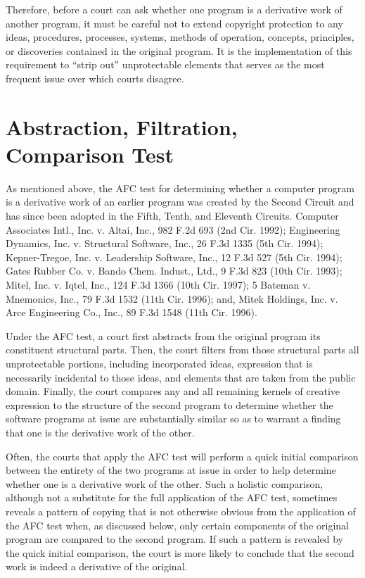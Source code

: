Therefore, before a court can ask whether one program is a derivative work
of another program, it must be careful not to extend copyright protection
to any ideas, procedures, processes, systems, methods of operation,
concepts, principles, or discoveries contained in the original program. It
is the implementation of this requirement to ``strip out'' unprotectable
elements that serves as the most frequent issue over which courts
disagree.

\section{Abstraction, Filtration, Comparison Test}

As mentioned above, the AFC test for determining whether a computer
program is a derivative work of an earlier program was created by the
Second Circuit and has since been adopted in the Fifth, Tenth, and
Eleventh Circuits. Computer Associates Intl., Inc. v. Altai, Inc., 982
F.2d 693 (2nd Cir. 1992); Engineering Dynamics, Inc. v. Structural
Software, Inc., 26 F.3d 1335 (5th Cir. 1994); Kepner-Tregoe,
Inc. v. Leadership Software, Inc., 12 F.3d 527 (5th Cir. 1994); Gates
Rubber Co. v. Bando Chem. Indust., Ltd., 9 F.3d 823 (10th Cir. 1993);
Mitel, Inc. v. Iqtel, Inc., 124 F.3d 1366 (10th Cir. 1997); 5 Bateman
v. Mnemonics, Inc., 79 F.3d 1532 (11th Cir. 1996); and, Mitek Holdings,
Inc. v. Arce Engineering Co., Inc., 89 F.3d 1548 (11th Cir. 1996).

Under the AFC test, a court first abstracts from the original program its
constituent structural parts. Then, the court filters from those
structural parts all unprotectable portions, including incorporated ideas,
expression that is necessarily incidental to those ideas, and elements
that are taken from the public domain. Finally, the court compares any and
all remaining kernels of creative expression to the structure of the
second program to determine whether the software programs at issue are
substantially similar so as to warrant a finding that one is the
derivative work of the other.

Often, the courts that apply the AFC test will perform a quick initial
comparison between the entirety of the two programs at issue in order to
help determine whether one is a derivative work of the other. Such a
holistic comparison, although not a substitute for the full application of
the AFC test, sometimes reveals a pattern of copying that is not otherwise
obvious from the application of the AFC test when, as discussed below,
only certain components of the original program are compared to the second
program. If such a pattern is revealed by the quick initial comparison,
the court is more likely to conclude that the second work is indeed a
derivative of the original.

